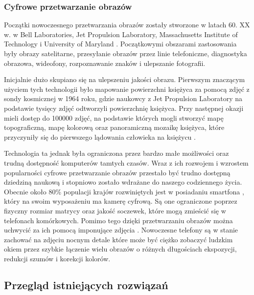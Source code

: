 \subsubsection{Cyfrowe przetwarzanie obrazów}
Początki nowoczesnego przetwarzania obrazów zostały stworzone w latach 60. XX w. w Bell Laboratories, Jet Propulsion Laboratory, Massachusetts Institute of Technology i University of Maryland \cite{computerProcessing}. 
Początkowymi obszarami zastosowania były obrazy satelitarne, przesyłanie obrazów przez linie telefoniczne, diagnostyka obrazowa, wideofony, rozpoznawanie znaków i ulepszanie fotografii. 

Inicjalnie dużo skupiano się na ulepszeniu jakości obrazu. Pierwszym znaczącym użyciem tych technologii było mapowanie powierzchni księżyca za pomocą zdjęć z sondy kosmicznej w 1964 roku, gdzie naukowcy z Jet Propulsion Laboratory na podstawie tysięcy zdjęć odtworzyli powierzchnię księżyca. 
Przy następnej okazji mieli dostęp do 100000 zdjęć, na podstawie których mogli stworzyć mapę topograficzną, mapę kolorową oraz panoramiczną mozaikę księżyca, które przyczyniły się do pierwszego lądowania człowieka na księżycu \cite{digitalImageProcessing}.

Technologia ta jednak była ograniczona przez bardzo małe możliwości oraz trudną dostępność komputerów tamtych czasów. 
Wraz z ich rozwojem i wzrostem popularności cyfrowe przetwarzanie obrazów przestało być trudno dostępną dziedziną naukową i stopniowo zostało wdrażane do naszego codziennego życia. 
Obecnie około 80\% populacji krajów rozwiniętych jest w posiadaniu smartfona \cite{smartphones}, który na swoim wyposażeniu ma kamerę cyfrową. 
Są one ograniczone poprzez fizyczny rozmiar matrycy oraz jakość soczewek, które mogą zmieścić się w telefonach komórkowych. 
Pomimo tego dzięki przetwarzaniu obrazów można uchwycić za ich pomocą imponujące zdjęcia \cite{pixel}. 
Nowoczesne telefony są w stanie zachować na zdjęciu nocnym detale które może być ciężko zobaczyć ludzkim okiem \cite{nightMode} przez szybkie łączenie wielu obrazów o różnych długościach ekspozycji, redukcji szumów i korekcji kolorów.   
\subsection{Przegląd istniejących rozwiązań}
